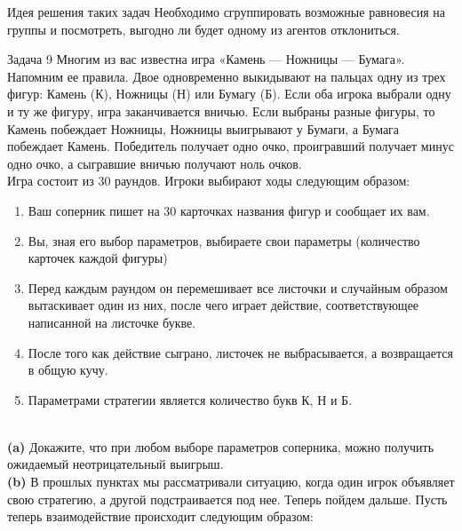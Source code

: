 \begin{mybox}{Идея решения таких задач}
    \indent\setlength{\parindent}{1em}\indent\setlength{\parindent}{1em}Необходимо сгруппировать возможные равновесия на группы и посмотреть, выгодно ли будет одному из агентов
    отклониться.
\end{mybox}

\begin{mybox}{Задача 9}
    \indent\setlength{\parindent}{1em}\indent\setlength{\parindent}{1em}Многим из вас известна игра «Камень — Ножницы — Бумага». Напомним ее правила. Двое одновременно выкидывают на пальцах одну из трех фигур: Камень (К), Ножницы (Н) или Бумагу (Б). Если оба игрока выбрали одну и ту же фигуру, игра заканчивается вничью. Если выбраны разные фигуры, то Камень побеждает Ножницы, Ножницы выигрывают у Бумаги, а Бумага побеждает Камень. Победитель получает одно очко, проигравший получает минус одно очко, а сыгравшие вничью получают ноль очков.\\
    \indent\setlength{\parindent}{1em}Игра состоит из 30 раундов. Игроки выбирают ходы следующим образом:
    \begin{enumerate}
        \item Ваш соперник пишет на 30 карточках названия фигур и сообщает их вам.
        \item Вы, зная его выбор параметров, выбираете свои параметры (количество карточек каждой фигуры)
        \item Перед каждым раундом он перемешивает все листочки и случайным образом вытаскивает один из них, после чего играет действие, соответствующее написанной на листочке букве.
        \item После того как действие сыграно, листочек не выбрасывается, а возвращается в общую кучу.
        \item Параметрами стратегии является количество букв К, Н и Б.
    \end{enumerate}
    \smallskip\\
    \indent\setlength{\parindent}{1em}\indent\setlength{\parindent}{1em}\textbf{(a)} Докажите, что при любом выборе параметров соперника, можно получить ожидаемый неотрицательный выигрыш.\smallskip\\
    \indent\setlength{\parindent}{1em}\textbf{(b)} В прошлых пунктах мы рассматривали ситуацию, когда один игрок объявляет свою стратегию, а другой подстраивается под нее. Теперь пойдем дальше. Пусть теперь взаимодействие происходит следующим образом:
    \begin{enumerate}

\end{enumerate}
\end{mybox}
